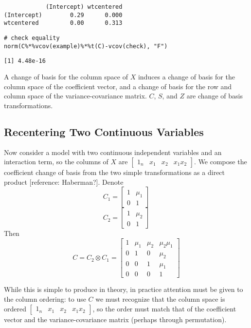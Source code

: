 \documentclass[]{article}
\begin{document}
\begin{verbatim}
            (Intercept) wtcentered
(Intercept)        0.29      0.000
wtcentered         0.00      0.313
\end{verbatim}

\begin{verbatim}
# check equality
norm(C%*%vcov(example)%*%t(C)-vcov(check), "F")
\end{verbatim}

\begin{verbatim}
[1] 4.48e-16
\end{verbatim}

A change of basis for the column space of \(X\) induces a change of
basis for the column space of the coefficient vector, and a change of
basis for the row and column space of the variance-covariance matrix.
\(C\), \(S\), and \(Z\) are change of basis transformations.

\subsection{Recentering Two Continuous
Variables}\label{recentering-two-continuous-variables}

Now consider a model with two continuous independent variables and an
interaction term, so the columns of \(X\) are
\(\begin{bmatrix} 1_n &x_1 &x_2 &x_1x_2 \end{bmatrix}\). We compose the
coefficient change of basis from the two simple transformations as a
direct product {[}reference: Haberman?{]}. Denote
\[C_1=\begin{bmatrix}1 & \mu_1 \\ 0 & 1 \end{bmatrix}\]
\[C_2=\begin{bmatrix}1 & \mu_2 \\ 0 & 1 \end{bmatrix}\] Then
\[C = C_2 \otimes C_1 = \begin{bmatrix} 1 & \mu_1 &\mu_2 &\mu_2\mu_1 \\
  0 &1 &0 &\mu_2 \\ 0 &0 &1 &\mu_1 \\ 0 &0 &0 &1 \end{bmatrix}\]

While this is simple to produce in theory, in practice attention must be
given to the column ordering: to use \(C\) we must recognize that the
column space is ordered
\(\begin{bmatrix} 1_n &x_1 &x_2 &x_1x_2 \end{bmatrix}\), so the order
must match that of the coefficient vector and the variance-covariance
matrix (perhaps through permutation).
\end{document}
